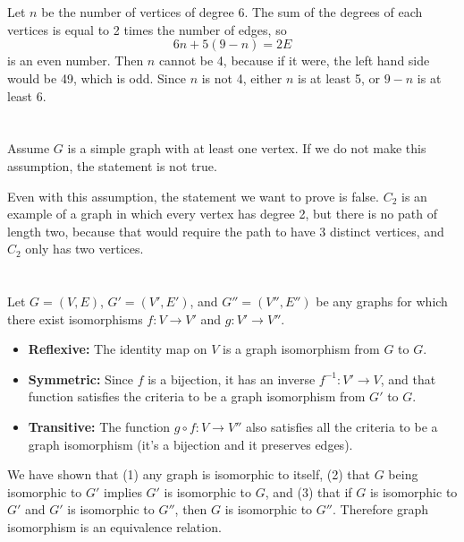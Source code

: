\documentclass[12pt]{article}
\begin{document}
\section{}
\noindent{}\bigskip\par
Let $n$ be the number of vertices of degree 6. The sum of the degrees of each vertices is equal to 2 times the number of edges, so
\[ 6n + 5(9-n) = 2E \]
is an even number. Then $n$ cannot be 4, because if it were, the left hand side would be 49, which is odd. Since $n$ is not 4, either $n$ is at least 5, or $9-n$ is at least 6.

\section{}
\noindent{}\bigskip\par
Assume $G$ is a simple graph with at least one vertex. If we do not make this assumption, the statement is not true.
\par
Even with this assumption, the statement we want to prove is false. $C_2$ is an example of a graph in which every vertex has degree 2, but there is no path of length two, because that would require the path to have 3 distinct vertices, and $C_2$ only has two vertices.

\section{}
\noindent{}\bigskip\par
Let $G=(V,E)$, $G'=(V',E')$, and $G''=(V'',E'')$ be any graphs for which there exist isomorphisms $f: V \rightarrow V'$ and $g: V' \rightarrow V''$.
\begin{itemize}
    \item \textbf{Reflexive:} The identity map on $V$ is a graph isomorphism from $G$ to $G$.
    \item \textbf{Symmetric:} Since $f$ is a bijection, it has an inverse $f^{-1}: V' \rightarrow V$, and that function satisfies the criteria to be a graph isomorphism from $G'$ to $G$.
    \item \textbf{Transitive:} The function $g \circ f: V \rightarrow V''$ also satisfies all the criteria to be a graph isomorphism (it's a bijection and it preserves edges).
\end{itemize}
We have shown that (1) any graph is isomorphic to itself, (2) that $G$ being isomorphic to $G'$ implies $G'$ is isomorphic to $G$, and (3) that if $G$ is isomorphic to $G'$ and $G'$ is isomorphic to $G''$, then $G$ is isomorphic to $G''$. Therefore graph isomorphism is an equivalence relation.
\end{document}
